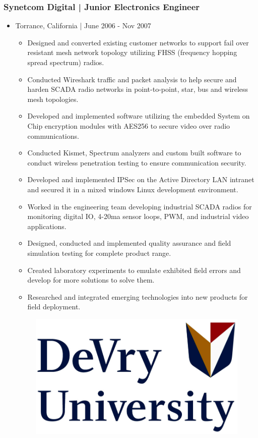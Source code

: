 \documentclass[letter,10pt]{article}
\begin{document}
\subsubsection*{Synetcom Digital | Junior Electronics Engineer}
\label{sec:org59a5efe}
\begin{itemize}
\item Torrance, California | June 2006 - Nov 2007
\label{sec:orgbf576e5}
\begin{itemize}
\item Designed and converted existing customer networks to support fail over resistant mesh network topology utilizing FHSS (frequency hopping spread spectrum) radios.
\item Conducted Wireshark traffic and packet analysis to help secure and harden SCADA radio networks in point-to-point, star, bus and wireless mesh topologies.
\item Developed and implemented software utilizing the embedded System on Chip encryption modules with AES256 to secure video over radio communications.
\item Conducted Kismet, Spectrum analyzers and custom built software to conduct wireless penetration testing to ensure communication security.
\item Developed and implemented IPSec on the Active Directory LAN intranet and secured it in a mixed windows Linux development environment.
\item Worked in the engineering team developing industrial SCADA radios for monitoring digital IO, 4-20ma sensor loops, PWM, and industrial video applications.
\item Designed, conducted and implemented quality assurance and field simulation testing for complete product range.
\item Created laboratory experiments to emulate exhibited field errors and develop for more solutions to solve them.
\item Researched and integrated emerging technologies into new products for field deployment.
\end{itemize}

\begin{figure}
\includegraphics[width=0.8\linewidth]{./img/50p_cr_devry.jpg}
\end{figure}
\end{itemize}
\end{document}
